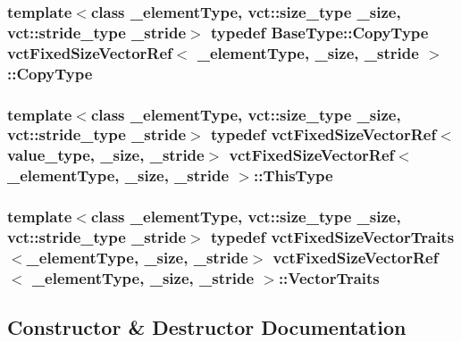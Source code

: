 \subsubsection[{Copy\+Type}]{\setlength{\rightskip}{0pt plus 5cm}template$<$class \+\_\+element\+Type, vct\+::size\+\_\+type \+\_\+size, vct\+::stride\+\_\+type \+\_\+stride$>$ typedef {\bf Base\+Type\+::\+Copy\+Type} {\bf vct\+Fixed\+Size\+Vector\+Ref}$<$ \+\_\+element\+Type, \+\_\+size, \+\_\+stride $>$\+::{\bf Copy\+Type}}\label{classvct_fixed_size_vector_ref_a43b5dfaa1ac96d6e47aaa9e44b4d7f92}
\hypertarget{classvct_fixed_size_vector_ref_a3fc8fbdfc7492a38119e7ed7ef5bc289}{}
\subsubsection[{This\+Type}]{\setlength{\rightskip}{0pt plus 5cm}template$<$class \+\_\+element\+Type, vct\+::size\+\_\+type \+\_\+size, vct\+::stride\+\_\+type \+\_\+stride$>$ typedef {\bf vct\+Fixed\+Size\+Vector\+Ref}$<$value\+\_\+type, \+\_\+size, \+\_\+stride$>$ {\bf vct\+Fixed\+Size\+Vector\+Ref}$<$ \+\_\+element\+Type, \+\_\+size, \+\_\+stride $>$\+::{\bf This\+Type}}\label{classvct_fixed_size_vector_ref_a3fc8fbdfc7492a38119e7ed7ef5bc289}
\hypertarget{classvct_fixed_size_vector_ref_a9061c9a151a2e67a207cdff219e165b4}{}
\subsubsection[{Vector\+Traits}]{\setlength{\rightskip}{0pt plus 5cm}template$<$class \+\_\+element\+Type, vct\+::size\+\_\+type \+\_\+size, vct\+::stride\+\_\+type \+\_\+stride$>$ typedef {\bf vct\+Fixed\+Size\+Vector\+Traits}$<$\+\_\+element\+Type, \+\_\+size, \+\_\+stride$>$ {\bf vct\+Fixed\+Size\+Vector\+Ref}$<$ \+\_\+element\+Type, \+\_\+size, \+\_\+stride $>$\+::{\bf Vector\+Traits}}\label{classvct_fixed_size_vector_ref_a9061c9a151a2e67a207cdff219e165b4}


\subsection{Constructor \& Destructor Documentation}
\hypertarget{classvct_fixed_size_vector_ref_a543ec7356fcb875f9242700d1928316c}{}
